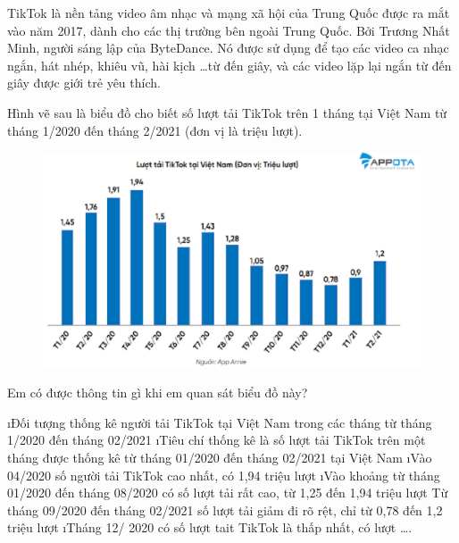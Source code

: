 \begin{bt}
	TikTok là nền tảng video âm nhạc và mạng xã hội của Trung Quốc được ra mắt vào năm 2017, dành cho các thị trường bên ngoài Trung Quốc. Bởi Trương Nhất Minh, người sáng lập của ByteDance. Nó được sử dụng để tạo các video ca nhạc ngắn, hát nhép, khiêu vũ, hài kịch \ldots từ   đến   giây, và các video lặp lại ngắn từ   đến   giây được giới trẻ yêu thích. 
	
	Hình vẽ sau là biểu đồ cho biết số lượt tải TikTok trên 1 tháng tại Việt Nam từ tháng 1/2020 đến tháng 2/2021 (đơn vị là triệu lượt).
	\begin{figure}[H]
		\centering
		\vspace*{-5pt}
		\captionsetup{labelformat= empty, justification=centering}
		\includegraphics[width=0.5\linewidth]{25}
		\vspace*{-10pt}
	\end{figure}
	Em có được thông tin gì khi em quan sát biểu đồ này?
	\begin{loigiaichuong42}
		\begin{enumerate}[--,leftmargin=*]
			\i Đối tượng thống kê người tải TikTok tại Việt Nam trong các tháng từ tháng 1/2020 đến tháng 02/2021
			\i Tiêu chí thống kê là số lượt tải TikTok trên một tháng được thống kê từ tháng 01/2020 đến tháng 02/2021 tại Việt Nam 
			\i Vào 04/2020 số người tải TikTok cao nhất, có 1,94 triệu lượt
			\i Vào khoảng từ tháng 01/2020 đến tháng 08/2020 có số lượt tải rất cao, từ 1,25  đến 1,94 triệu lượt
			Từ tháng 09/2020 đến tháng 02/2021 số lượt tải giảm đi rõ rệt, chỉ từ 0,78 đến 1,2 triệu lượt 
			\i Tháng 12/ 2020 có số lượt tait TikTok là thấp nhất, có  lượt \ldots.
		\end{enumerate}
	\end{loigiaichuong42}
\end{bt}
